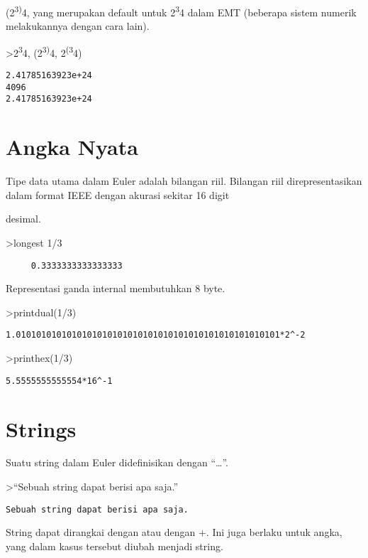 \documentclass[
]{book}
\begin{document}
(2\textsuperscript{3)}4, yang merupakan default untuk 2\textsuperscript{3}4 dalam EMT (beberapa sistem numerik melakukannya dengan cara lain).

\textgreater2\textsuperscript{3}4, (2\textsuperscript{3)}4, 2\textsuperscript{(3}4)

\begin{verbatim}
2.41785163923e+24
4096
2.41785163923e+24
\end{verbatim}

\section{Angka Nyata}\label{angka-nyata}

Tipe data utama dalam Euler adalah bilangan riil. Bilangan riil direpresentasikan dalam format IEEE dengan akurasi sekitar 16 digit

desimal.

\textgreater longest 1/3

\begin{verbatim}
     0.3333333333333333 
\end{verbatim}

Representasi ganda internal membutuhkan 8 byte.

\textgreater printdual(1/3)

\begin{verbatim}
1.0101010101010101010101010101010101010101010101010101*2^-2
\end{verbatim}

\textgreater printhex(1/3)

\begin{verbatim}
5.5555555555554*16^-1
\end{verbatim}

\section{Strings}\label{strings}

Suatu string dalam Euler didefinisikan dengan ``\ldots{}''.

\textgreater{}``Sebuah string dapat berisi apa saja.''

\begin{verbatim}
Sebuah string dapat berisi apa saja.
\end{verbatim}

String dapat dirangkai dengan \textbar{} atau dengan +. Ini juga berlaku untuk angka, yang dalam kasus tersebut diubah menjadi string.
\end{document}
